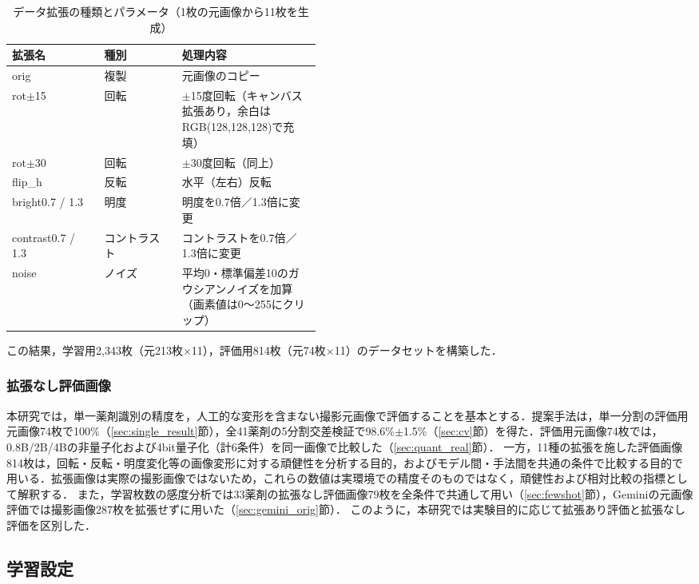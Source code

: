 \documentclass[dvipdfmx]{jsarticle}
\begin{document}
\begin{table}[htbp]
\centering
\caption{データ拡張の種類とパラメータ（1枚の元画像から11枚を生成）}
\label{tab:aug}
\small
\begin{tabular}{llp{0.45\linewidth}}
\hline
拡張名 & 種別 & 処理内容 \\
\hline
orig & 複製 & 元画像のコピー \\
rot$\pm$15 & 回転 & $\pm$15度回転（キャンバス拡張あり，余白はRGB(128,128,128)で充填） \\
rot$\pm$30 & 回転 & $\pm$30度回転（同上） \\
flip\_h & 反転 & 水平（左右）反転 \\
bright0.7 / 1.3 & 明度 & 明度を0.7倍／1.3倍に変更 \\
contrast0.7 / 1.3 & コントラスト & コントラストを0.7倍／1.3倍に変更 \\
noise & ノイズ & 平均0・標準偏差10のガウシアンノイズを加算（画素値は0〜255にクリップ） \\
\hline
\end{tabular}
\end{table}

この結果，学習用2,343枚（元213枚$\times$11），評価用814枚（元74枚$\times$11）のデータセットを構築した．

\subsubsection{拡張なし評価画像}

本研究では，単一薬剤識別の精度を，人工的な変形を含まない撮影元画像で評価することを基本とする．提案手法は，単一分割の評価用元画像74枚で100\%（\ref{sec:single_result}節），全41薬剤の5分割交差検証で98.6\%$\pm$1.5\%（\ref{sec:cv}節）を得た．評価用元画像74枚では，0.8B/2B/4Bの非量子化および4bit量子化（計6条件）を同一画像で比較した（\ref{sec:quant_real}節）．
一方，11種の拡張を施した評価画像814枚は，回転・反転・明度変化等の画像変形に対する頑健性を分析する目的，およびモデル間・手法間を共通の条件で比較する目的で用いる．拡張画像は実際の撮影画像ではないため，これらの数値は実環境での精度そのものではなく，頑健性および相対比較の指標として解釈する．
また，学習枚数の感度分析では33薬剤の拡張なし評価画像79枚を全条件で共通して用い（\ref{sec:fewshot}節），Geminiの元画像評価では撮影画像287枚を拡張せずに用いた（\ref{sec:gemini_orig}節）．
このように，本研究では実験目的に応じて拡張あり評価と拡張なし評価を区別した．

\subsection{学習設定}
\end{document}

